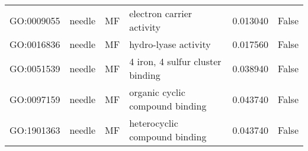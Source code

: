 \begin{longtable}{llllrl}
GO:0009055 & needle & MF &                     electron carrier activity  & 0.013040 &   False \\
GO:0016836 & needle & MF &                          hydro-lyase activity  & 0.017560 &   False \\
GO:0051539 & needle & MF &              4 iron, 4 sulfur cluster binding  & 0.038940 &   False \\
GO:0097159 & needle & MF &               organic cyclic compound binding  & 0.043740 &   False \\
GO:1901363 & needle & MF &                 heterocyclic compound binding  & 0.043740 &   False \\
\bottomrule
\end{longtable}
